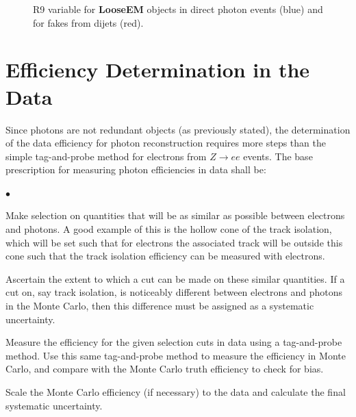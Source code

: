 \documentclass{cmspaper}
\begin{document}
\begin{figure}[hbtp]
  \begin{center}
    \caption{R9 variable for {\bf LooseEM} objects in direct photon events (blue) and for fakes from dijets (red).}
    \label{fig:Photonid_r9}
  \end{center}
\end{figure}

\section{Efficiency Determination in the Data}
Since photons are not redundant objects (as previously stated), the determination of the data efficiency for photon reconstruction requires more steps than the simple tag-and-probe method for electrons from $Z\rightarrow ee$ events.
The base prescription for measuring photon efficiencies in data shall be:
\begin{list}{$\bullet$}
\item{Make selection on quantities that will be as similar as possible between electrons and photons.  A good example of this is the hollow cone of the track isolation, which will be set such that for electrons the associated track will be outside this
cone such that the track isolation efficiency can be measured with electrons.}
\item{Ascertain the extent to which a cut can be made on these similar quantities.  If a cut on, say track isolation, is noticeably different between electrons and photons in the Monte Carlo, then this difference must be assigned as a systematic uncertainty.}
\item{Measure the efficiency for the given selection cuts in data using a tag-and-probe method.  Use this same tag-and-probe method to measure the efficiency in Monte Carlo, and compare with the Monte Carlo truth efficiency to check for bias.} 
\item{Scale the Monte Carlo efficiency (if necessary) to the data and calculate the final systematic uncertainty.}
\end{list}
\end{document}
